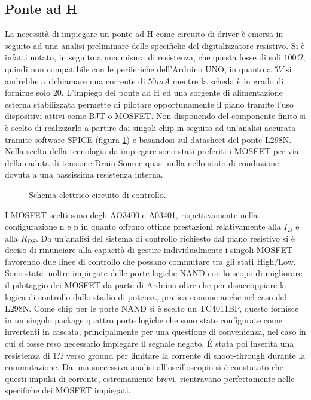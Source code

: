 \documentclass[12pt,twoside,openright]{article}
\begin{document}
\subsection{Ponte ad H}\label{hbridge}
La necessità di impiegare un ponte ad H come circuito di driver è emersa in seguito ad una analisi preliminare delle specifiche del digitalizzatore resistivo. Si è infatti notato, in seguito a una misura di resistenza, che questa fosse di soli $100 \Omega$, quindi non compatibile con le periferiche dell'Arduino UNO, in quanto a $5V$ si andrebbe a richiamare una corrente di $50mA$ mentre la scheda è in grado di fornirne solo $20$. L'impiego del ponte ad H ed una sorgente di alimentazione esterna stabilizzata permette di pilotare opportunamente il piano tramite l'uso dispositivi attivi come BJT o MOSFET. Non disponendo del componente finito si è scelto di realizzarlo a partire dai singoli chip in seguito ad un'analisi accurata tramite software SPICE (figura \ref{fig:controllo}) e basandosi sul datasheet del ponte L298N.\cite{l298n} Nella scelta della tecnologia da impiegare sono stati preferiti i MOSFET per via della caduta di tensione Drain-Source quasi nulla nello stato di conduzione dovuta a una bassissima resistenza interna. 
\begin{figure}[h!]
\centering
{}
\caption{Schema elettrico circuito di controllo.} \label{fig:controllo}
\end{figure}
I MOSFET scelti sono degli AO3400 e A03401, rispettivamente nella configurazione n e p in quanto offrono ottime prestazioni relativamente alla $I_D$ e alla $R_{DS}$.\cite{ao3400}\cite{ao3401} Da un'analisi del sistema di controllo richiesto dal piano resistivo si è deciso di rinunciare alla capacità di gestire individualmente i singoli MOSFET favorendo due linee di controllo che possano commutare tra gli stati High/Low. Sono state inoltre impiegate delle porte logiche NAND con lo scopo di migliorare il pilotaggio dei MOSFET da parte di Arduino oltre che per disaccoppiare la logica di controllo dallo stadio di potenza, pratica comune anche nel caso del L298N. Come chip per le porte NAND si è scelto un TC4011BP, questo fornisce in un singolo package quattro porte logiche che sono state configurate come invertenti in cascata, principalmente per una questione di convenienza, nel caso in cui si fosse reso necessario impiegare il segnale negato.\cite{TC4011BP} É stata poi inserita una resistenza di $1\Omega$ verso ground per limitare la corrente di shoot-through durante la commutazione. Da una successiva analisi all'oscilloscopio si è constatato che questi impulsi di corrente, estremamente brevi, rientravano perfettamente nelle specifiche dei MOSFET impiegati.
\end{document}
